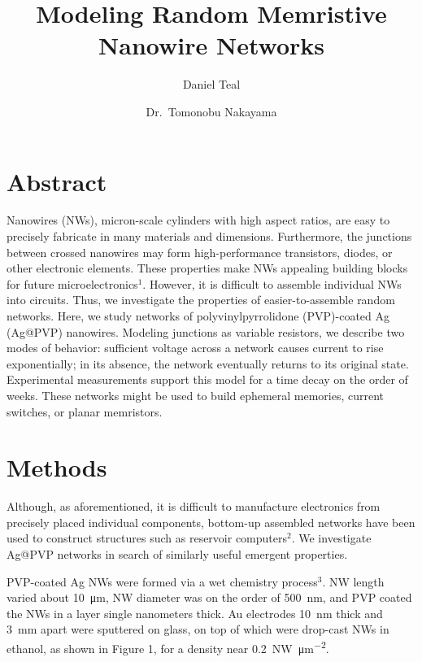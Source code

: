 \documentclass[twocolumn]{article}
\title{\vspace{-.2in}\textbf{Modeling Random Memristive Nanowire Networks}}
\author[1,2]{Daniel Teal}
\author[3]{Dr.\ Tomonobu Nakayama}
\affil[1]{Mechanical Engineering \& Mathematics, the University of Texas at Austin}
\affil[2]{2018 iREU NNCI/NIMS Internship Program}
\affil[3]{Nano Functionality Integration Group, MANA, NIMS}
\date{}
\begin{document}
\maketitle

\section{Abstract}

Nanowires (NWs), micron-scale cylinders with high aspect ratios, are easy to precisely fabricate in many materials and dimensions. Furthermore, the junctions between crossed nanowires may form high-performance transistors, diodes, or other electronic elements. These properties make NWs appealing building blocks for future microelectronics$^1$. However, it is difficult to assemble individual NWs into circuits. Thus, we investigate the properties of easier-to-assemble random networks. Here, we study networks of polyvinylpyrrolidone (PVP)-coated Ag (Ag@PVP) nanowires. Modeling junctions as variable resistors, we describe two modes of behavior: sufficient voltage across a network causes current to rise exponentially; in its absence, the network eventually returns to its original state. Experimental measurements support this model for a time decay on the order of weeks. These networks might be used to build ephemeral memories, current switches, or planar memristors.

\section{Methods}

Although, as aforementioned, it is difficult to manufacture electronics from precisely placed individual components, bottom-up assembled networks have been used to construct structures such as reservoir computers$^2$. We investigate Ag@PVP networks in search of similarly useful emergent properties.

PVP-coated Ag NWs were formed via a wet chemistry process$^3$. NW length varied about \SI{10}{\micro\meter}, NW diameter was on the order of \SI{500}{\nano\meter}, and PVP coated the NWs in a layer single nanometers thick. Au electrodes \SI{10}{\nano\meter} thick and \SI{3}{\milli\meter} apart were sputtered on glass, on top of which were drop-cast NWs in ethanol, as shown in Figure 1, for a density near \SI{0.2}{NW\per\micro\meter^2}.
\end{document}

